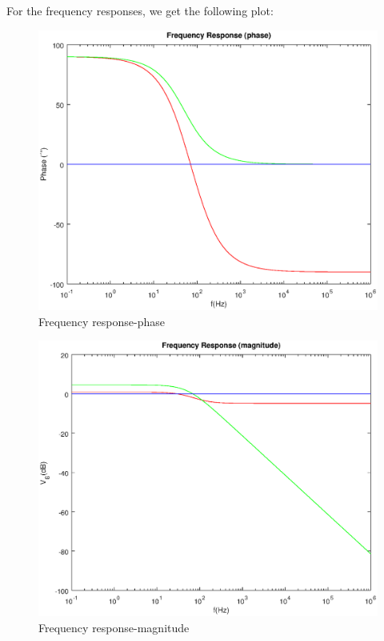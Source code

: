   For the frequency responses, we get the following plot:
    \begin{figure}[H] \centering
    \includegraphics[width=1\linewidth]{degree.eps}
    \caption{Frequency response-phase}
    \label{fig:frequencyresponsephase}
    \end{figure}
    
      \begin{figure}[H] \centering
    \includegraphics[width=1\linewidth]{dB.eps}
    \caption{Frequency response-magnitude}
    \label{fig:frequencyresponsemagnitude}
    \end{figure}
  